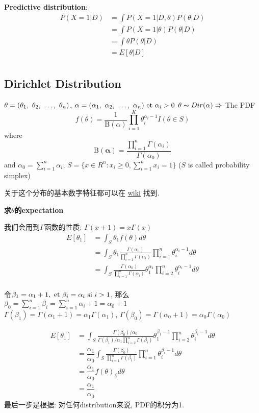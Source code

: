 \documentclass{article}
\begin{document}
\textbf{Predictive distribution}:\\
$$
\begin{aligned}
P(X=1|D) 
& = \int P(X=1|D,\theta) P(\theta|D) \\
& = \int P(X=1|\theta) P(\theta|D) \\
& = \int \theta P(\theta|D) \\
& = E[\theta|D]\\
\end{aligned}
$$

\subsection{Dirichlet Distribution}
$\theta = (\theta_1,~\theta_2,~\ldots,~\theta_n)$, $\alpha = (\alpha_1,~\alpha_2,~\ldots,~\alpha_n) \textrm{\ et } \alpha_i > 0$
$\theta \thicksim{D}ir(\alpha) \Rightarrow$ 
The PDF
$$ f(\theta) = \frac{1}{\mathrm{B}(\alpha)} \prod_{i=1}^K \theta_i^{\alpha_i - 1} I(\theta \in S) $$
where
$$
\mathrm{B}(\boldsymbol\alpha) 
= \frac{\prod_{i=1}^n \Gamma(\alpha_i)}{\Gamma(\alpha_0)}
$$
and 
$\alpha_0 = \sum_{i=1}^n \alpha_i$, 
$S = \{x \in R^n: x_i \geq 0, \sum_{i=1}^n x_i = 1\}$ ($S$ is called probability simplex)

关于这个分布的基本数字特征都可以在
\href{http://en.wikipedia.org/wiki/Dirichlet\_distribution}{wiki}
找到.

\textbf{求$\theta$的expectation}

我们会用到$\Gamma$函数的性质: $\Gamma(x+1) = x \Gamma(x)$
$$
\begin{aligned}
E[\theta_1]
& = \int_S \theta_1 f(\theta) d\theta \\
& = \int_S \theta_1 \frac{\Gamma(\alpha_0)}{\prod_{i=1}^n \Gamma(\alpha_i)} \prod_{i=1}^n \theta_i^{\alpha_i - 1} d\theta \\
& = \int_S \frac{\Gamma(\alpha_0)}{\prod_{i=1}^n \Gamma(\alpha_i)} \theta_1^{\alpha_1} \prod_{i=2}^n \theta_i^{\alpha_i - 1} d\theta \\
\end{aligned}
$$

令$\beta_1 = \alpha_1 + 1,\textrm{\ et } \beta_i =  \alpha_i \textrm{\ si } i > 1$, 那么 \\
$\beta_0 = \sum_{i = 1}^n \beta_i = \sum_{i = 1}^n \alpha_i + 1 = \alpha_0 + 1$ \\
$\Gamma(\beta_1) = \Gamma(\alpha_1 + 1) = \alpha_1 \Gamma(\alpha_1)$, 
$\Gamma(\beta_0) = \Gamma(\alpha_0 + 1) = \alpha_0 \Gamma(\alpha_0)$

$$
\begin{aligned}
E[\theta_1]
& = \int_S \frac{\Gamma(\beta_0) / \alpha_0}{\Gamma(\beta_1) / \alpha_1 \prod_{i=2}^n \Gamma(\beta_i)} \theta_1^{\beta_1 - 1} \prod_{i=2}^n \theta_i^{\beta_i - 1} d\theta \\
& = \dfrac{\alpha_1}{\alpha_0} \int_S \frac{\Gamma(\beta_0)}{\prod_{i=1}^n \Gamma(\beta_i)} \prod_{i=1}^n \theta_i^{\beta_i - 1} d\theta \\
& = \dfrac{\alpha_1}{\alpha_0} f(\theta)_\beta d\theta \\
& = \dfrac{\alpha_1}{\alpha_0}
\end{aligned}
$$
最后一步是根据: 对任何distribution来说, PDF的积分为1.
\end{document}
